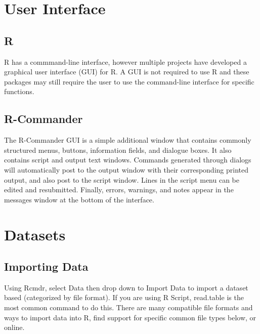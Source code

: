 %
%
%
%
%

\section{User Interface}

\subsection{R}
R has a commmand-line interface, however multiple projects have developed a graphical user interface (GUI) for R. A GUI is not required to use R and these packages may still require the user to use the command-line interface for specific functions.


\subsection{R-Commander}
The R-Commander GUI is a simple additional window that contains commonly structured menus, buttons, information fields, and dialogue boxes. It also contains script and output text windows. Commands generated through dialogs will automatically post to the output window with their corresponding printed output, and also post to the script window. Lines in the script menu can be edited and resubmitted. Finally, errors, warnings, and notes appear in the messages window at the bottom of the interface.


\section{Datasets}

\subsection{Importing Data}
Using Rcmdr, select Data then drop down to Import Data to import a dataset based (categorized by file format). If you are using R Script, read.table is the most common command to do this. There are many compatible file formats and ways to import data into R, find support for specific common file types below, or online.

